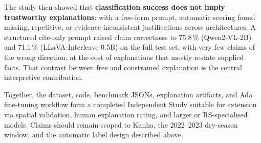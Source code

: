 \documentclass[11pt]{article}
\begin{document}
The study then showed that \textbf{classification success does not imply trustworthy explanations}: with a free-form prompt, automatic scoring found missing, repetitive, or evidence-inconsistent justifications across architectures. A structured cite-only prompt raised claim correctness to 75.8\,\% (Qwen2-VL-2B) and 71.1\,\% (LLaVA-Interleave-0.5B) on the full test set, with very few claims of the wrong direction, at the cost of explanations that mostly restate supplied facts. That contrast between free and constrained explanation is the central interpretive contribution.

Together, the dataset, code, benchmark JSONs, explanation artifacts, and Ada fine-tuning workflow form a completed Independent Study suitable for extension via spatial validation, human explanation rating, and larger or RS-specialised models. Claims should remain scoped to Kanha, the 2022--2023 dry-season window, and the automatic label design described above.
\end{document}
